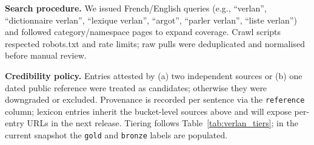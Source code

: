 \documentclass[12pt]{article}
\begin{document}
\noindent \textbf{Search procedure.} We issued French/English queries (e.g., “verlan”, “dictionnaire verlan”, “lexique verlan”, “argot”, “parler verlan”, “liste verlan”) and followed category/namespace pages to expand coverage. Crawl scripts respected robots.txt and rate limits; raw pulls were deduplicated and normalised before manual review.

\noindent \textbf{Credibility policy.} Entries attested by (a) two independent sources or (b) one dated public reference were treated as candidates; otherwise they were downgraded or excluded. Provenance is recorded per sentence via the \texttt{reference} column; lexicon entries inherit the bucket-level sources above and will expose per-entry URLs in the next release. Tiering follows Table~\ref{tab:verlan_tiers}; in the current snapshot the \texttt{gold} and \texttt{bronze} labels are populated.

\end{document}
